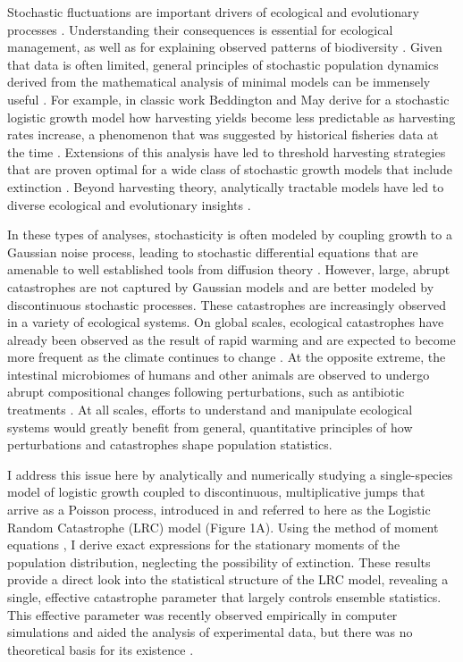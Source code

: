 Stochastic fluctuations are important drivers of ecological and evolutionary processes \cite{levins1968evolution,landeBook,melbingerSREP_2015,fisher2014transition}.  Understanding their consequences is essential for ecological management, as well as for explaining observed patterns of biodiversity \cite{landeBook}.  Given that data is often limited, general principles of stochastic population dynamics derived from the mathematical analysis of minimal models can be immensely useful  \cite{landeBook,hastings2016timescales}.  For example, in classic work  \cite{beddington1977harvesting} Beddington and May derive for a stochastic logistic growth model how harvesting yields become less predictable as harvesting rates increase, a phenomenon that was suggested by historical fisheries data at the time \cite{schaefer1957study}.  Extensions of this analysis have led to threshold harvesting strategies that are proven optimal for a wide class of stochastic growth models that include extinction \cite{lande1995optimal}.  Beyond harvesting theory, analytically tractable models have led to diverse ecological and evolutionary insights \cite{levins1968evolution,melbingerSREP_2015,dickens2016analytically}.

In these types of analyses, stochasticity is often modeled by coupling growth to a Gaussian noise process, leading to stochastic differential equations that are amenable to well established tools from diffusion theory \cite{landeBook,karlin1981second}.  However, large, abrupt catastrophes are not captured by Gaussian models and are better modeled by discontinuous stochastic processes.  These catastrophes are increasingly observed in a variety of ecological systems.  On global scales, ecological catastrophes have already been observed as the result of rapid warming and are expected to become more frequent as the climate continues to change \cite{pershing2015slow}.  At the opposite extreme, the intestinal microbiomes of humans and other animals are observed to undergo abrupt compositional changes following perturbations, such as antibiotic treatments \cite{trosvik2015biotic, caporaso2011moving, relmanABX_2011,wilesPLOS2016}.  At all scales, efforts to understand and manipulate ecological systems would greatly benefit from general, quantitative principles of how perturbations and catastrophes shape population statistics.

I address this issue here by  analytically and numerically studying a single-species model of logistic growth coupled to discontinuous, multiplicative jumps that arrive as a Poisson process, introduced in \cite{hanson1981} and referred to here as the Logistic Random Catastrophe (LRC) model (Figure 1A). Using the method of moment equations \cite{bover1978moment}, I derive exact expressions for the stationary moments of the population distribution, neglecting the possibility of extinction.  These results provide a direct look into the statistical structure of the LRC model, revealing a single, effective catastrophe parameter that largely controls ensemble statistics.  This effective parameter was recently observed empirically in computer simulations and aided the analysis of experimental data, but there was no theoretical basis for its existence \cite{wilesPLOS2016}.  

